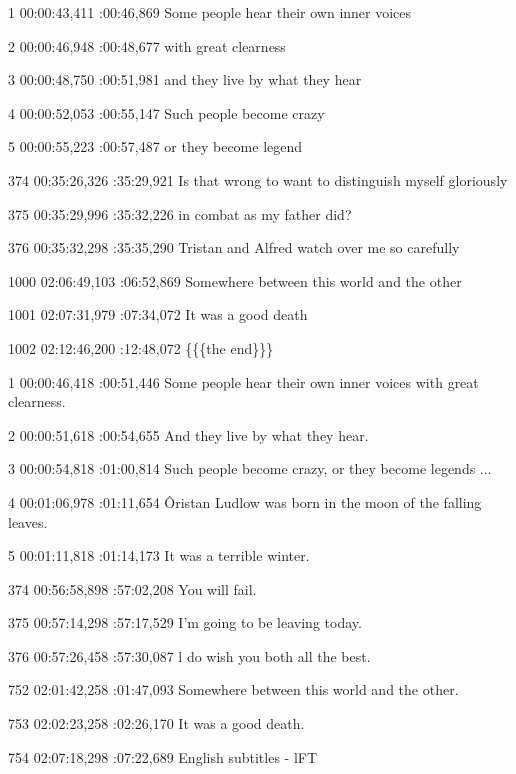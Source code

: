 \begin{subexam}
1
00:00:43,411 :00:46,869
Some people hear their own
inner voices

2
00:00:46,948 :00:48,677
with great clearness

3
00:00:48,750 :00:51,981
and they live
by what they hear

4
00:00:52,053 :00:55,147
Such people become crazy

5
00:00:55,223 :00:57,487
or they become legend

374
00:35:26,326 :35:29,921
Is that wrong to want
to distinguish myself gloriously

375
00:35:29,996 :35:32,226
in combat as my father did?

376
00:35:32,298 :35:35,290
Tristan and Alfred
watch over me so carefully

1000
02:06:49,103 :06:52,869
Somewhere between this world
and the other

1001
02:07:31,979 :07:34,072
It was a good death

1002
02:12:46,200 :12:48,072
\{\{\{the end\}\}\}
\end{subexam}
\hspace{0.5cm}
\begin{subexam}
1
00:00:46,418 :00:51,446
Some people hear their own
inner voices with great clearness.

2
00:00:51,618 :00:54,655
And they live by what they hear.

3
00:00:54,818 :01:00,814
Such people become crazy,
or they become legends ...

4
00:01:06,978 :01:11,654
Ôristan Ludlow was born
in the moon of the falling leaves.

5
00:01:11,818 :01:14,173
It was a terrible winter.

374
00:56:58,898 :57:02,208
You will fail.

375
00:57:14,298 :57:17,529
I'm going to be leaving today.

376
00:57:26,458 :57:30,087
l do wish you both all the best.

752
02:01:42,258 :01:47,093
Somewhere between this world
and the other.

753
02:02:23,258 :02:26,170
It was a good death.

754
02:07:18,298 :07:22,689
English subtitles - lFT
\end{subexam}

